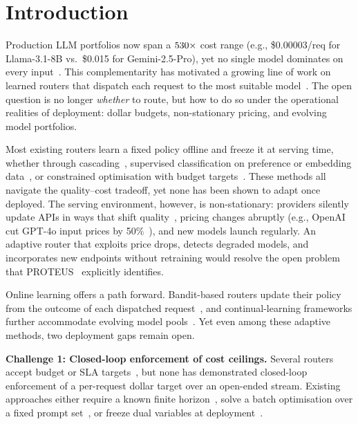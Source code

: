 \section{Introduction}
\label{sec:intro}

Production LLM portfolios now span a $530\times$ cost range (e.g., \$0.00003/req for Llama-3.1-8B vs.\ \$0.015 for Gemini-2.5-Pro), yet no single model dominates on every input~\cite{chen2024routerdc, feng2025graphrouter}. This complementarity has motivated a growing line of work on learned routers that dispatch each request to the most suitable model~\cite{chen2023frugalgpt, ong2024routellm, panda2025pilot}. The open question is no longer \emph{whether} to route, but how to do so under the operational realities of deployment: dollar budgets, non-stationary pricing, and evolving model portfolios.

Most existing routers learn a fixed policy offline and freeze it at serving time, whether through cascading~\cite{chen2023frugalgpt}, supervised classification on preference or embedding data~\cite{ong2024routellm, chen2024routerdc, feng2025graphrouter}, or constrained optimisation with budget targets~\cite{ma2025omnirouter, bhatti2026proteus}. These methods all navigate the quality--cost tradeoff, yet none has been shown to adapt once deployed. The serving environment, however, is non-stationary: providers silently update APIs in ways that shift quality~\cite{chen2023chatgptdrift, ma2024prompt}, pricing changes abruptly (e.g., OpenAI cut GPT-4o input prices by 50\%~\cite{openai2024gpt4opricing}), and new models launch regularly. An adaptive router that exploits price drops, detects degraded models, and incorporates new endpoints without retraining would resolve the open problem that PROTEUS~\cite{bhatti2026proteus} explicitly identifies.

Online learning offers a path forward. Bandit-based routers update their policy from the outcome of each dispatched request~\cite{panda2025pilot, wang2025barp, li2025llmbandit}, and continual-learning frameworks further accommodate evolving model pools~\cite{wang2025mixllm}. Yet even among these adaptive methods, two deployment gaps remain open.

\noindent\textbf{Challenge 1: Closed-loop enforcement of cost ceilings.}
Several routers accept budget or SLA targets~\cite{panda2025pilot, ma2025omnirouter, bhatti2026proteus}, but none has demonstrated closed-loop enforcement of a per-request dollar target over an open-ended stream. Existing approaches either require a known finite horizon~\cite{panda2025pilot}, solve a batch optimisation over a fixed prompt set~\cite{ma2025omnirouter}, or freeze dual variables at deployment~\cite{bhatti2026proteus}.

